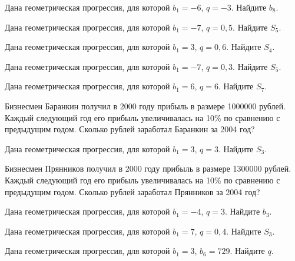 \documentclass[4apaper]{article}
\begin{document}
\begin{taskBN}{61}
Дана геометрическая прогрессия, для которой $b_1 = -6$, $q=-3$. Найдите $b_{8}$.
\end{taskBN}

\begin{taskBN}{62}
Дана геометрическая прогрессия, для которой $b_1 = -7$, $q=0,5$. Найдите $S_{5}$.
\end{taskBN}

\begin{taskBN}{63}
Дана геометрическая прогрессия, для которой $b_1 = 3$, $q=0,6$. Найдите $S_{4}$.
\end{taskBN}

\begin{taskBN}{64}
Дана геометрическая прогрессия, для которой $b_1 = -7$, $q=0,3$. Найдите $S_{5}$.
\end{taskBN}

\begin{taskBN}{65}
Дана геометрическая прогрессия, для которой $b_1 = 6$, $q=6$. Найдите $S_{7}$.
\end{taskBN}

\begin{taskBN}{66}
Бизнесмен Баранкин получил в 2000 году прибыль в размере 1000000 рублей. Каждый следующий год его прибыль увеличивалась на 10\% по сравнению с предыдущим годом. Сколько рублей заработал Баранкин за 2004 год?
\end{taskBN}

\begin{taskBN}{67}
Дана геометрическая прогрессия, для которой $b_1 = 3$, $q=3$. Найдите $S_{3}$.
\end{taskBN}

\begin{taskBN}{68}
Бизнесмен Прянников получил в 2000 году прибыль в размере 1300000 рублей. Каждый следующий год его прибыль увеличивалась на 10\% по сравнению с предыдущим годом. Сколько рублей заработал Прянников за 2004 год?
\end{taskBN}

\begin{taskBN}{69}
Дана геометрическая прогрессия, для которой $b_1 = -4$, $q=3$. Найдите $b_{3}$.
\end{taskBN}

\begin{taskBN}{70}
Дана геометрическая прогрессия, для которой $b_1 = 7$, $q=0,4$. Найдите $S_{3}$.
\end{taskBN}

\begin{taskBN}{71}
Дана геометрическая прогрессия, для которой $b_1 = 3$, $b_{6}=729$. Найдите $q$.
\end{taskBN}
\end{document}
